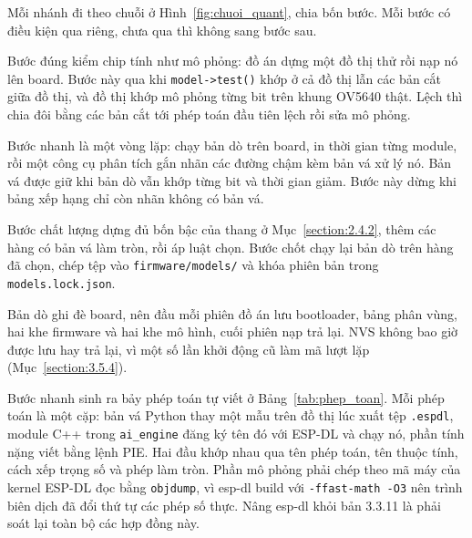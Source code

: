 \documentclass[../DoAn.tex]{subfiles}
\begin{document}
Mỗi nhánh đi theo chuỗi ở Hình~\ref{fig:chuoi_quant}, chia bốn bước. Mỗi bước có điều kiện
qua riêng, chưa qua thì không sang bước sau.

Bước đúng kiểm chip tính như mô phỏng: đồ án dựng một đồ thị thử rồi nạp nó lên board. Bước này qua khi \texttt{model->test()} khớp ở cả đồ thị
lẫn các bản cắt giữa đồ thị, và đồ thị khớp mô phỏng từng bit trên khung OV5640 thật. Lệch thì chia
đôi bằng các bản cắt tới phép toán đầu tiên lệch rồi sửa mô phỏng.

Bước nhanh là một vòng lặp: chạy bản dò trên board, in thời gian từng module, rồi một công cụ
phân tích gắn nhãn các đường chậm kèm bản vá xử lý nó. Bản vá được giữ khi bản dò
vẫn khớp từng bit và thời gian giảm. Bước này dừng khi bảng xếp hạng chỉ còn nhãn không có bản vá.

Bước chất lượng dựng đủ bốn bậc của thang ở Mục~\ref{section:2.4.2}, thêm các hàng có bản vá
làm tròn, rồi áp luật chọn. Bước chốt chạy lại bản dò trên hàng đã chọn, chép tệp vào
\texttt{firmware/models/} và khóa phiên bản trong \texttt{models.lock.json}.

Bản dò ghi đè board, nên đầu mỗi phiên đồ án lưu bootloader, bảng phân vùng, hai khe firmware và
hai khe mô hình, cuối phiên nạp trả lại. NVS không bao giờ được lưu hay trả lại, vì một số lần khởi động cũ
làm mã lượt lặp (Mục~\ref{section:3.5.4}).

Bước nhanh sinh ra bảy phép toán tự viết ở Bảng~\ref{tab:phep_toan}. Mỗi phép toán là một cặp: bản
vá Python thay một mẫu trên đồ thị lúc xuất tệp \texttt{.espdl}, module C++ trong
\texttt{ai\_engine} đăng ký tên đó với ESP-DL và chạy nó, phần tính nặng viết bằng lệnh PIE. Hai đầu
khớp nhau qua tên phép toán, tên thuộc tính, cách xếp trọng số và phép làm tròn. Phần mô phỏng phải
chép theo mã máy của kernel ESP-DL đọc bằng \texttt{objdump}, vì esp-dl build với
\texttt{-ffast-math -O3} nên trình biên dịch đã đổi thứ tự các phép số thực. Nâng esp-dl khỏi bản
3.3.11 là phải soát lại toàn bộ các hợp đồng này.
\end{document}
